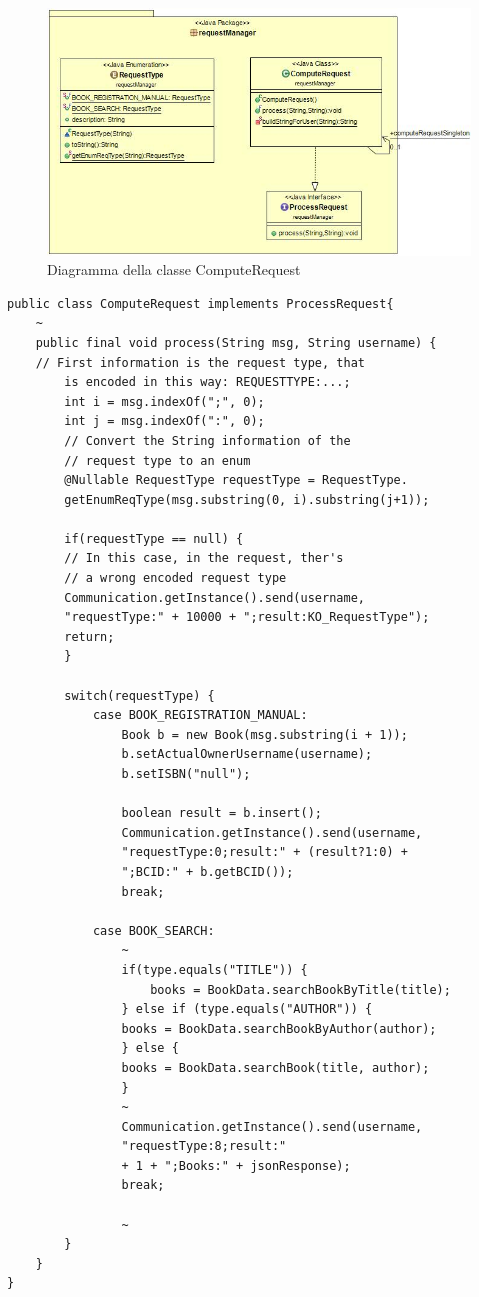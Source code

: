 \begin{figure}[h]
	\includegraphics[width=\textwidth]{Immagini/UML_ComputeRequestServer}
	\caption{Diagramma della classe ComputeRequest}
	\label{fig:Diagramma della class ComputeRequest}
\end{figure}

\begin{lstlisting}
public class ComputeRequest implements ProcessRequest{
	~
	public final void process(String msg, String username) {
	// First information is the request type, that 
		is encoded in this way: REQUESTTYPE:...;
		int i = msg.indexOf(";", 0);
		int j = msg.indexOf(":", 0);
		// Convert the String information of the 
		// request type to an enum
		@Nullable RequestType requestType = RequestType.
		getEnumReqType(msg.substring(0, i).substring(j+1));

		if(requestType == null) {
		// In this case, in the request, ther's 
		// a wrong encoded request type
		Communication.getInstance().send(username,
		"requestType:" + 10000 + ";result:KO_RequestType");
		return;
		}

		switch(requestType) {
			case BOOK_REGISTRATION_MANUAL:
				Book b = new Book(msg.substring(i + 1));
				b.setActualOwnerUsername(username);
				b.setISBN("null");

				boolean result = b.insert();
				Communication.getInstance().send(username,
				"requestType:0;result:" + (result?1:0) + 
				";BCID:" + b.getBCID());
				break;
				
			case BOOK_SEARCH:
				~
				if(type.equals("TITLE")) {
					books = BookData.searchBookByTitle(title);
				} else if (type.equals("AUTHOR")) {
				books = BookData.searchBookByAuthor(author);
				} else {
				books = BookData.searchBook(title, author);
				}
				~
				Communication.getInstance().send(username, 
				"requestType:8;result:" 
				+ 1 + ";Books:" + jsonResponse);
				break;
				
				~
		}
	}
}
\end{lstlisting}
